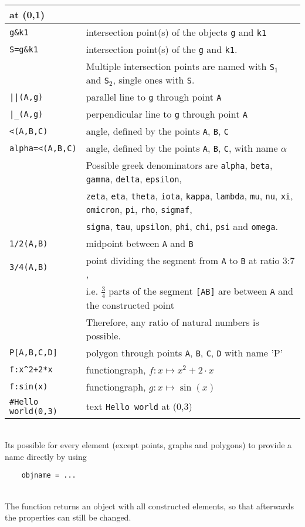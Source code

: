\documentclass[10pt]{article}
\begin{document}
\begin{tabular}{|l|l|}
at (0,1) \\ \hline \verb+g&k1+ & intersection point(s) of the
objects \verb'g' and \verb'k1' \\ \hline \verb+S=g&k1+ &
intersection point(s) of the \verb'g' and \verb'k1'.  \\ &
Multiple intersection points
are named with \verb'S'$_1$ and \verb'S'$_2$, single ones with \verb'S'. \\
\hline\verb+||(A,g)+ & parallel line to \verb'g' through point
\verb'A'
\\  \hline\verb+|_(A,g)+ & perpendicular line to \verb'g' through point
\verb'A' \\ \hline\verb+<(A,B,C)+ & angle, defined by the points \verb'A', \verb'B', \verb'C' \\
\hline\verb+alpha=<(A,B,C)+ & angle, defined by the points
\verb'A', \verb'B', \verb'C', with name $\alpha$
\\  & Possible greek denominators are \verb'alpha',
\verb'beta', \verb'gamma', \verb'delta', \verb'epsilon', \\ &
\verb'zeta', \verb'eta', \verb'theta', \verb'iota', \verb'kappa',
\verb'lambda', \verb'mu', \verb'nu', \verb'xi', \verb'omicron',
\verb'pi', \verb'rho', \verb'sigmaf', \\ & \verb'sigma',
\verb'tau', \verb'upsilon', \verb'phi', \verb'chi', \verb'psi' and
\verb'omega'. \\ \hline\verb+1/2(A,B)+ & midpoint between \verb'A'
and \verb'B'
\\ \hline\verb+3/4(A,B)+ & point dividing the segment from \verb'A'
to \verb'B' at ratio 3:7 , \\ & i.e. $\frac{3}{4}$ parts of the
segment \verb'[AB]' are between \verb'A' and the constructed point
\\ & Therefore, any ratio of natural numbers is possible. \\
\hline\verb+P[A,B,C,D]+ & polygon through points \verb'A',
\verb'B', \verb'C', \verb'D' with name 'P' \\
\hline\verb'f:x^2+2*x' & functiongraph, $f:x\mapsto x^2+2\cdot x$ \\
\hline\verb'f:sin(x)' & functiongraph, $g:x\mapsto \sin(x)$ \\
\hline\verb'#Hello world(0,3)' & text \verb'Hello world' at (0,3)
\\ \hline
\end{tabular} \vspace*{0.5cm} \\
Its possible for every element (except points, graphs and
polygons) to provide a name directly by using
\begin{verbatim}
    objname = ...
\end{verbatim} \\ The function returns an object with all constructed elements, so that afterwards
the properties can still be changed.
\end{document}
